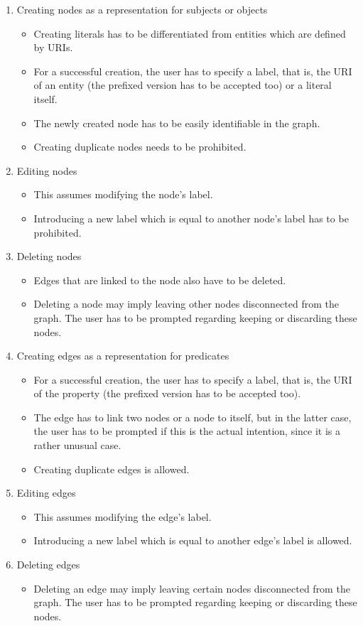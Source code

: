 \begin{enumerate}
  \item Creating nodes as a representation for subjects or objects
  \begin{itemize}
    \item Creating literals has to be differentiated from entities which are defined by URIs.
    \item  For a successful creation, the user has to specify a label, that is, the URI of an entity (the prefixed version has to be accepted too) or a literal itself.
    \item  The newly created node has to be easily identifiable in the graph.
    \item  Creating duplicate nodes needs to be prohibited.
  \end{itemize}
  \item Editing nodes
  \begin{itemize}
    \item This assumes modifying the node's label.
    \item Introducing a new label which is equal to another node's label has to be prohibited.
  \end{itemize}
  \item Deleting nodes
  \begin{itemize}
    \item Edges that are linked to the node also have to be deleted.
    \item Deleting a node may imply leaving other nodes disconnected from the graph. The user has to be prompted regarding keeping or discarding these nodes.
  \end{itemize}
  \item Creating edges as a representation for predicates
   \begin{itemize}
    \item  For a successful creation, the user has to specify a label, that is, the URI of the property (the prefixed version has to be accepted too).
    \item The edge has to link two nodes or a node to itself, but in the latter case, the user has to be prompted if this is the actual intention, since it is a rather unusual case.
    \item Creating duplicate edges is allowed.
  \end{itemize}
  \item Editing edges
   \begin{itemize}
    \item This assumes modifying the edge's label.
    \item Introducing a new label which is equal to another edge's label is allowed.
  \end{itemize}
  \item Deleting edges
  \begin{itemize}
    \item Deleting an edge may imply leaving certain nodes disconnected from the graph. The user has to be prompted regarding keeping or discarding these nodes.
  \end{itemize}
\end{enumerate}


